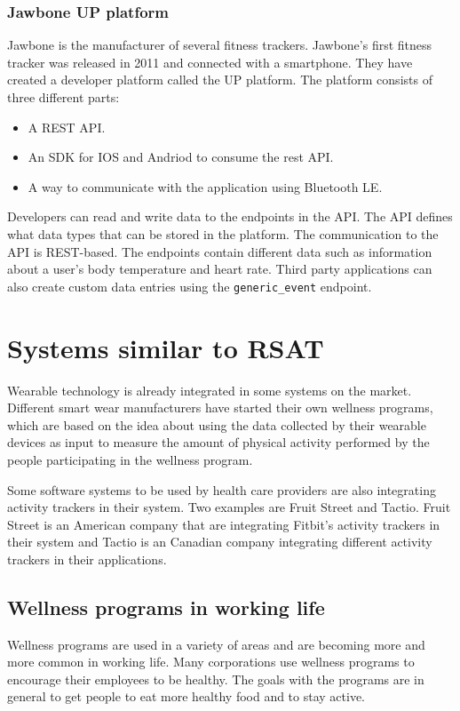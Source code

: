 \documentclass{cslthse-msc}
\begin{document}
\subsubsection{Jawbone UP platform}

Jawbone is the manufacturer of several fitness trackers. Jawbone's first fitness tracker was released in 2011 and connected with a smartphone\cite{guo2013evaluation}. They have created a developer platform called the UP platform. The platform consists of three different parts\cite{JawboneDeveloper}:

\begin{itemize}
\item A REST API.
\item An SDK for IOS and Andriod to consume the rest API.
\item A way to communicate with the application using Bluetooth LE.
\end{itemize}

Developers can read and write data to the endpoints in the API. The API defines what data types that can be stored in the platform. The communication to the API is REST-based. The endpoints contain different data such as information about a user's body temperature and heart rate. Third party applications can also create custom data entries using the \verb!generic_event! endpoint.\cite{JawboneCustomEndpoint}

\section{Systems similar to RSAT}

Wearable technology is already integrated in some systems on the market. Different smart wear manufacturers have started their own wellness programs, which are based on the idea about using the data collected by their wearable devices as input to measure the amount of physical activity performed by the people participating in the wellness program. 

Some software systems to be used by health care providers are also integrating activity trackers in their system. Two examples are Fruit Street and Tactio. Fruit Street is an American company that are integrating Fitbit's activity trackers in their system and Tactio is an Canadian company integrating different activity trackers in their applications.

\subsection{Wellness programs in working life}
\label{sec:wellness-programs}
Wellness programs are used in a variety of areas and are becoming more and more common in working life. Many corporations use wellness programs to encourage their employees to be healthy. The goals with the programs are in general to get people to eat more healthy food and to stay active.
\end{document}
